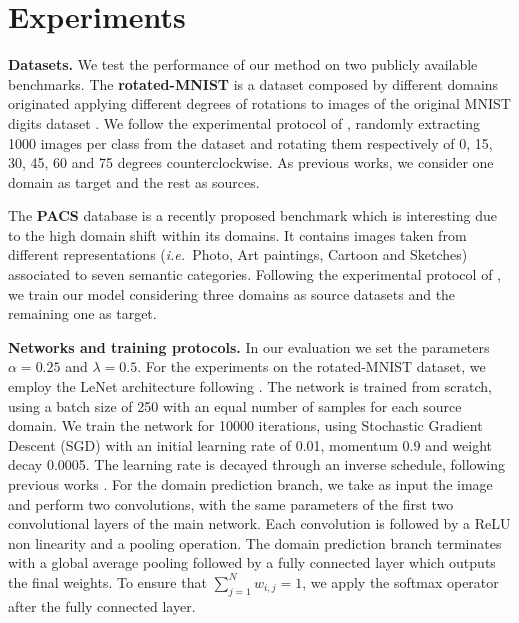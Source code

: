 \documentclass{article}
\newcommand{\ie}{\textit{i.e.~}}
\newcommand{\myparagraph}[1]{\vspace{5pt}\noindent\textbf{#1}}
\begin{document}
\section{Experiments}
\vspace{-0.3cm}
\myparagraph{Datasets.}
We test the performance of our method on two publicly available benchmarks. The \textbf{rotated-MNIST} \cite{ghifary2015domain} is a dataset composed by different domains originated applying different degrees of rotations to images of the original MNIST digits dataset \cite{lecun1998gradient}. We follow the experimental protocol of \cite{motiian2017unified}, randomly extracting 1000 images per class from the dataset and rotating them respectively of 0, 15, 30, 45, 60 and 75 degrees counterclockwise. As previous works, we consider one domain as target and the rest as sources. 

The \textbf{PACS} database \cite{li2017deeper} is a recently proposed benchmark which is interesting due to the high domain shift within its domains. It contains images taken from different representations (\ie Photo, Art paintings, Cartoon and Sketches) associated to seven semantic categories. Following the experimental protocol of \cite{li2017deeper}, we train our model considering three domains as source datasets and the remaining one as target. \vspace{-0.2em}

\myparagraph{Networks and training protocols.}
In our evaluation we set the parameters $\alpha=0.25$ and $\lambda=0.5$. 
For the experiments on the rotated-MNIST dataset, we employ the LeNet architecture \cite{lecun1998gradient} following \cite{motiian2017unified}. The network is trained from scratch, using a batch size of 250 with an equal number of samples for each source domain.  We train the network for 10000 iterations, using Stochastic Gradient Descent (SGD) with an initial learning rate of 0.01, momentum 0.9 and weight decay 0.0005. The learning rate is decayed through an inverse schedule, following previous works \cite{ganin2015unsupervised}. For the domain prediction branch, we take as input the image and perform two convolutions, with the same parameters of the first two convolutional layers of the main network. Each convolution is followed by a ReLU non linearity and a pooling operation. The domain prediction branch terminates with a global average pooling followed by a fully connected layer which outputs the final weights. To ensure that $\sum_{j=1}^N w_{i,j}=1$, we apply the softmax operator after the fully connected layer. 
 
\end{document}
